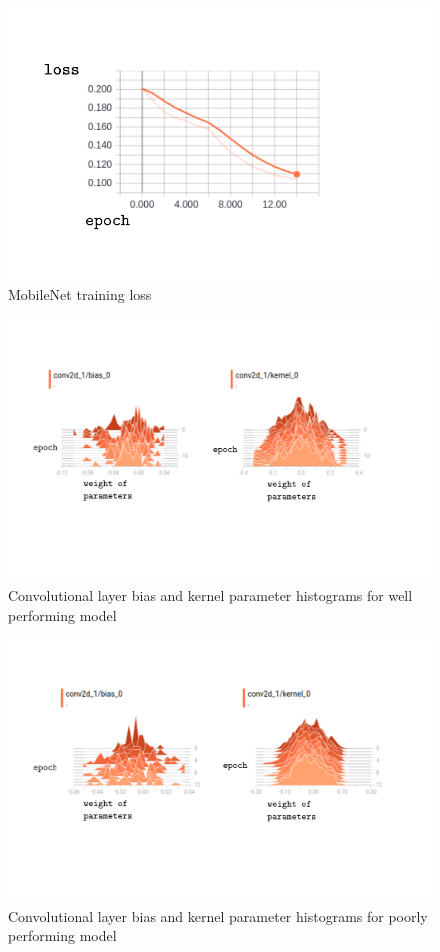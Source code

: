 \documentclass{article}
\begin{document}
{\begin{figure}[h]
  \includegraphics[width=\linewidth]{mobileloss.pdf}
  \caption{MobileNet training loss}
  \label{fig:mobileloss}
\end{figure}


\begin{figure}[h]
  \includegraphics[width=\linewidth]{goodearlyweights.pdf}
  \caption{Convolutional layer bias and kernel parameter histograms for well performing model}
  \label{fig:goodearlyweights}
\end{figure}

\begin{figure}[h]
  \includegraphics[width=\linewidth]{badearlyweights.pdf}
  \caption{Convolutional layer bias and kernel parameter histograms for poorly performing model}
  \label{fig:badearlyweights}
\end{figure}

}
\end{document}

